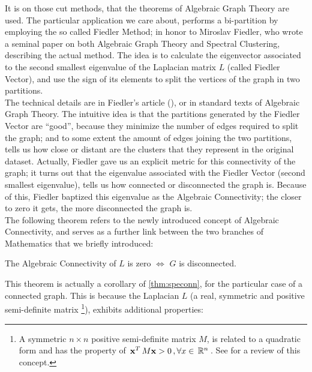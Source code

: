 It is on those cut methods, that the theorems of Algebraic
Graph Theory are used. The particular application we care about,
performs a bi-partition by employing the so called Fiedler Method; in
honor to Miroslav Fiedler, who wrote a seminal paper on both Algebraic
Graph Theory and Spectral Clustering, describing the actual
method. The idea is to calculate the eigenvector associated to the
second smallest eigenvalue of the Laplacian matrix $L$ (called Fiedler
Vector), and use the sign of 
its elements to split the vertices of the graph in two
partitions. \\

The technical details are in Fiedler's article
(\cite{fiedler73}), or in standard texts of Algebraic Graph Theory.
The intuitive idea is that the partitions generated by the Fiedler
Vector are ``good'', because they minimize the number of edges
required to split the graph; and to some extent the amount of edges
joining the two partitions, tells us how close or distant are the
clusters that they represent in the original dataset. Actually,
Fiedler gave us an explicit metric for this connectivity of the graph;
it turns out that the eigenvalue associated with the Fiedler Vector
(second smallest eigenvalue), tells us how connected or disconnected
the graph is. Because of this, Fiedler baptized this eigenvalue as the
Algebraic Connectivity; the closer to zero it gets, the more
disconnected the graph is. \\

The following theorem refers to the newly introduced concept of
Algebraic Connectivity, and serves as a further link between the two
branches of Mathematics that we briefly introduced: \\

\begin{theorem}
  \label{thm:algconn}
  The Algebraic Connectivity of $L$ is zero $\iff$ $G$ is disconnected. 
\end{theorem}

This theorem is actually a corollary of \cref{thm:speconn}, for
the particular case of a connected graph. This is because the
Laplacian $L$ (a real, symmetric and positive semi-definite
matrix \footnote{A symmetric $n \times n$ positive semi-definite matrix $M$, is
  related to a 
  quadratic form and has the property of $\,{\mathbf{x}}^{T}\,M\mathbf{x} > 0
\,, \forall x \in \,\mathbb{R}^{n}\,$. See \cite{strang88} for a review of this concept.}), exhibits additional properties: \\ 

